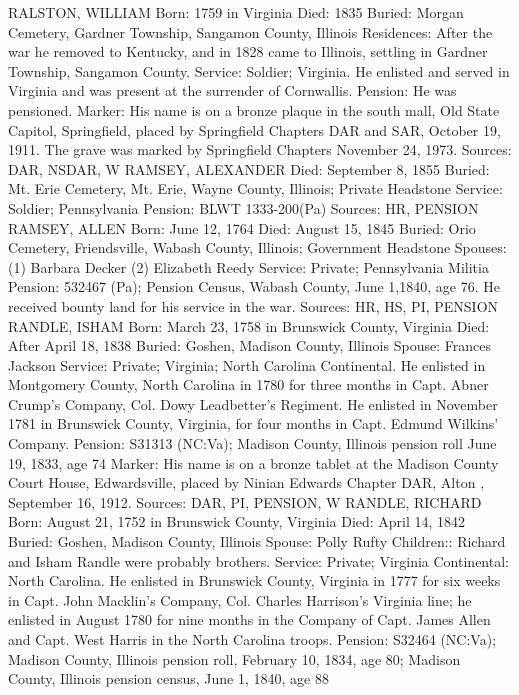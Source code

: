 RALSTON, WILLIAM
Born: 1759 in Virginia 
Died: 1835 
Buried: Morgan Cemetery, Gardner Township, Sangamon County, Illinois
Residences: After the war he removed to Kentucky, and in 1828 came to Illinois, settling in Gardner Township, Sangamon County.
Service: Soldier; Virginia. He enlisted and served in Virginia and was present at the surrender of Cornwallis. 
Pension: He was pensioned.
Marker: His name is on a bronze plaque in the south mall, Old State Capitol, Springfield, placed by Springfield Chapters DAR and SAR, October 19, 1911. The grave was marked by Springfield Chapters November 24, 1973.
Sources: DAR, NSDAR, W 
RAMSEY, ALEXANDER 
Died: September 8, 1855
Buried: Mt. Erie Cemetery, Mt. Erie, Wayne County, Illinois; Private Headstone
Service: Soldier; Pennsylvania 
Pension: BLWT 1333-200(Pa)
Sources: HR, PENSION 
RAMSEY, ALLEN
Born: June 12, 1764
Died: August 15, 1845
Buried: Orio Cemetery, Friendsville, Wabash County, Illinois; Government Head­stone
Spouses:  (1) Barbara Decker
	(2) Elizabeth Reedy
Service: Private; Pennsylvania Militia 
Pension: 532467 (Pa); Pension Census, Wabash County, June 1,1840, age 76. He received bounty land for his service in the war.
Sources: HR, HS, PI, PENSION 
RANDLE, ISHAM
Born: March 23, 1758 in Brunswick County, Virginia
Died: After April 18, 1838
Buried: Goshen, Madison County, Illinois
Spouse: Frances Jackson 
Service: Private; Virginia; North Carolina Continental. He enlisted in Montgomery County, North Carolina in 1780 for three months in Capt. Abner Crump's Company, Col. Dowy Leadbetter's Regiment. He enlisted in November 1781 in Brunswick County, Virginia, for four months in Capt. Edmund Wilkins' Company. 
Pension: S31313 (NC:Va); Madison County, Illinois pension roll June 19, 1833, age 74 
Marker: His name is on a bronze tablet at the Madison County Court House, Edwardsville, placed by Ninian Edwards Chapter DAR, Alton , September 16, 1912. 
Sources: DAR, PI, PENSION, W 
RANDLE, RICHARD 
Born: August 21, 1752 in Brunswick County, Virginia
Died: April 14, 1842
Buried: Goshen, Madison County, Illinois
Spouse: Polly Rufty
Children:: Richard and Isham Randle were probably brothers.
Service: Private; Virginia Continental: North Carolina. He enlisted in Brunswick 
County, Virginia in 1777 for six weeks in Capt. John Macklin's Company, Col. Charles Harrison's Virginia line; he enlisted in August 1780 for nine months in the Company of Capt. James Allen and Capt. West Harris in the North Carolina troops. 
Pension: S32464 (NC:Va); Madison County, Illinois pension roll, February 10, 1834, age 80; Madison County, Illinois pension census, June 1, 1840, age 88 
